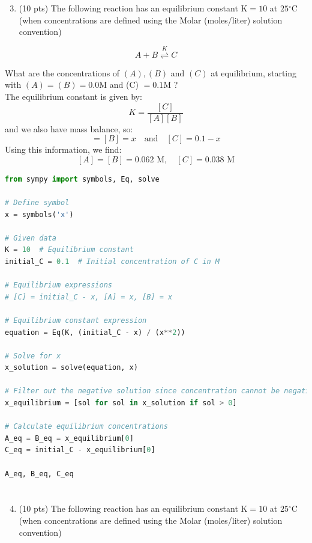 \documentclass[12 pt]{article}
\begin{document}
\section{}
\begin{enumerate}
  \setcounter{enumi}{2}
  \item (10 pts) The following reaction has an equilibrium constant $\mathrm{K}=10$ at $25{ }^{\circ} \mathrm{C}$ (when concentrations are defined using the Molar (moles/liter) solution convention)
\end{enumerate}

$$
A+B \stackrel{K}{\rightleftharpoons} C
$$

What are the concentrations of $(A),(B)$ and $(C)$ at equilibrium, starting with $(A)=(B)=0.0 \mathrm{M}$ and (C) $=0.1 \mathrm{M}$ ? \\
The equilibrium constant is given by:
\begin{equation}
  K = \frac{[C]}{[A][B]}
\end{equation}
and we also have mass balance, so:
\begin{equation}
  [A] = [B] =x \quad \text{and} \quad [C] = 0.1 - x
\end{equation}
Using this information, we find:
\begin{equation}
\boxed{[A] = [B] = 0.062 \text{ M}, \quad [C] = 0.038 \text{ M}}
\end{equation}
\begin{lstlisting}[language=Python]
from sympy import symbols, Eq, solve

# Define symbol
x = symbols('x')

# Given data
K = 10  # Equilibrium constant
initial_C = 0.1  # Initial concentration of C in M

# Equilibrium expressions
# [C] = initial_C - x, [A] = x, [B] = x

# Equilibrium constant expression
equation = Eq(K, (initial_C - x) / (x**2))

# Solve for x
x_solution = solve(equation, x)

# Filter out the negative solution since concentration cannot be negative
x_equilibrium = [sol for sol in x_solution if sol > 0]

# Calculate equilibrium concentrations
A_eq = B_eq = x_equilibrium[0]
C_eq = initial_C - x_equilibrium[0]

A_eq, B_eq, C_eq

\end{lstlisting}
\section{}
\begin{enumerate}
  \setcounter{enumi}{3}
  \item (10 pts) The following reaction has an equilibrium constant $\mathrm{K}=10$ at $25{ }^{\circ} \mathrm{C}$ (when concentrations are defined using the Molar (moles/liter) solution convention)
\end{enumerate}
\end{document}
